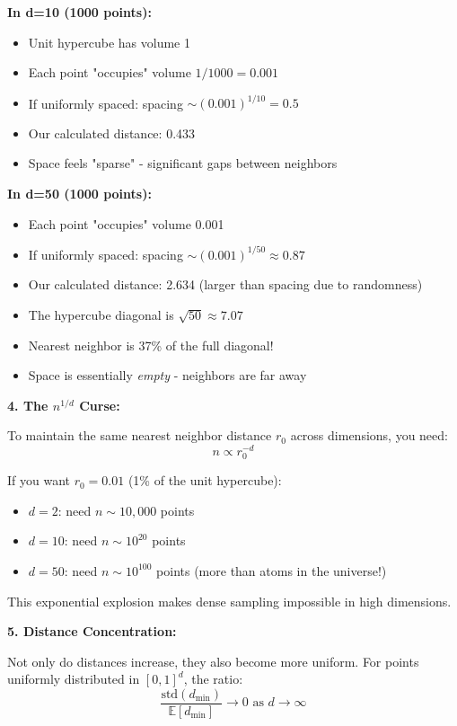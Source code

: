 \documentclass[12pt]{article}
\begin{document}
\begin{explanation}
\textbf{In d=10 (1000 points):}
\begin{itemize}
    \item Unit hypercube has volume 1
    \item Each point "occupies" volume \(1/1000 = 0.001\)
    \item If uniformly spaced: spacing \(\sim (0.001)^{1/10} = 0.5\)
    \item Our calculated distance: 0.433
    \item Space feels "sparse" - significant gaps between neighbors
\end{itemize}

\textbf{In d=50 (1000 points):}
\begin{itemize}
    \item Each point "occupies" volume 0.001
    \item If uniformly spaced: spacing \(\sim (0.001)^{1/50} \approx 0.87\)
    \item Our calculated distance: 2.634 (larger than spacing due to randomness)
    \item The hypercube diagonal is \(\sqrt{50} \approx 7.07\)
    \item Nearest neighbor is 37\% of the full diagonal!
    \item Space is essentially \textit{empty} - neighbors are far away
\end{itemize}

\textbf{4. The \(n^{1/d}\) Curse:}

To maintain the same nearest neighbor distance \(r_0\) across dimensions, you need:
\[
n \propto r_0^{-d}
\]

If you want \(r_0 = 0.01\) (1\% of the unit hypercube):
\begin{itemize}
    \item \(d=2\): need \(n \sim 10,000\) points
    \item \(d=10\): need \(n \sim 10^{20}\) points
    \item \(d=50\): need \(n \sim 10^{100}\) points (more than atoms in the universe!)
\end{itemize}

This exponential explosion makes dense sampling impossible in high dimensions.

\textbf{5. Distance Concentration:}

Not only do distances increase, they also become more uniform. For points uniformly distributed in \([0,1]^d\), the ratio:
\[
\frac{\text{std}(d_{\min})}{\mathbb{E}[d_{\min}]} \to 0 \text{ as } d \to \infty
\]


\end{explanation}
\end{document}
